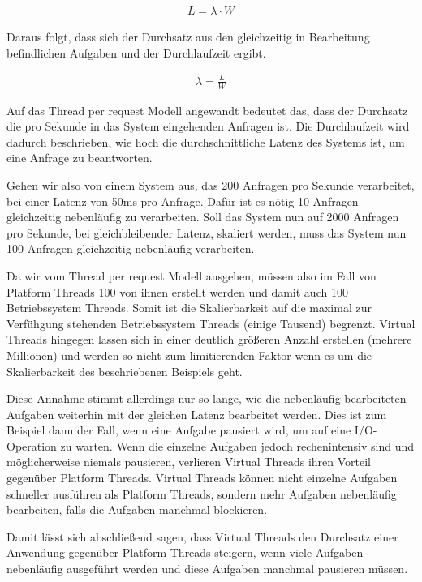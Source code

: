 \documentclass[fontsize=12pt,paper=a4,twoside=semi,parskip=half-,headsepline,headinclude]{scrreprt}
\begin{document}
\begin{eqnarray}
	L = \lambda \cdot W \nonumber
\end{eqnarray}

Daraus folgt, dass sich der Durchsatz aus den gleichzeitig in Bearbeitung befindlichen Aufgaben und der Durchlaufzeit ergibt.

\begin{eqnarray}
	\lambda = \frac{L}{W} \nonumber
\end{eqnarray}

Auf das Thread per request Modell angewandt bedeutet das, dass der Durchsatz die pro Sekunde in das System eingehenden Anfragen ist. Die Durchlaufzeit wird dadurch beschrieben, wie hoch die durchschnittliche Latenz des Systems ist, um eine Anfrage zu beantworten. 

Gehen wir also von einem System aus, das 200 Anfragen pro Sekunde verarbeitet, bei einer Latenz von 50ms pro Anfrage. Dafür ist es nötig 10 Anfragen gleichzeitig nebenläufig zu verarbeiten. Soll das System nun auf 2000 Anfragen pro Sekunde, bei gleichbleibender Latenz, skaliert werden, muss das System nun 100  Anfragen gleichzeitig nebenläufig verarbeiten.

Da wir vom Thread per request Modell ausgehen, müssen also im Fall von  Platform Threads 100 von ihnen erstellt werden und damit auch 100 Betriebssystem Threads. Somit ist die Skalierbarkeit auf die maximal zur Verfühgung stehenden Betriebssystem Threads (einige Tausend) begrenzt. Virtual Threads hingegen lassen sich in einer deutlich größeren Anzahl erstellen (mehrere Millionen) und werden so nicht zum limitierenden Faktor wenn es um die Skalierbarkeit des beschriebenen Beispiels geht.

Diese Annahme stimmt allerdings nur so lange, wie die nebenläufig bearbeiteten Aufgaben weiterhin mit der gleichen Latenz bearbeitet werden. Dies ist zum Beispiel dann der Fall, wenn eine Aufgabe pausiert wird, um auf eine I/O-Operation zu warten. Wenn die einzelne Aufgaben jedoch rechenintensiv sind und möglicherweise niemals pausieren, verlieren Virtual Threads ihren Vorteil gegenüber Platform Threads. Virtual Threads können nicht einzelne Aufgaben schneller ausführen als Platform Threads, sondern mehr Aufgaben nebenläufig bearbeiten, falls die Aufgaben manchmal blockieren. 

Damit lässt sich abschließend sagen, dass Virtual Threads den Durchsatz einer Anwendung gegenüber Platform Threads steigern, wenn viele Aufgaben nebenläufig ausgeführt werden und diese Aufgaben manchmal pausieren müssen.
\end{document}
